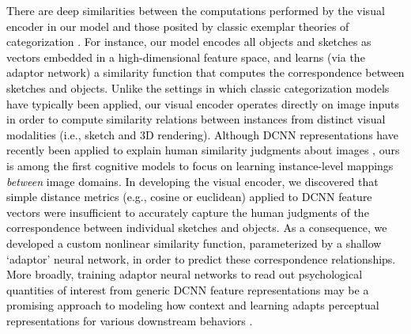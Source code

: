 \documentclass{svjour3}
\newcommand{\revised}[1]{\textcolor{Black}{#1}}
\begin{document}

\revised{There are deep similarities between the computations performed by the visual encoder in our model and those posited by classic exemplar theories of categorization \citep*{shepard1958stimulus,medin1978context,nosofsky1988exemplar}. For instance, our model encodes all objects and sketches as vectors embedded in a high-dimensional feature space, and learns (via the adaptor network) a similarity function that computes the correspondence between sketches and objects. Unlike the settings in which classic categorization models have typically been applied, our visual encoder operates directly on image inputs in order to compute similarity relations between instances from distinct visual modalities (i.e., sketch and 3D rendering). Although DCNN representations have recently been applied to explain human similarity judgments about images \citep*{peterson2018evaluating,kubilius2016deep}, ours is among the first cognitive models to focus on learning instance-level mappings \textit{between} image domains. In developing the visual encoder, we discovered that simple distance metrics (e.g., cosine or euclidean) applied to DCNN feature vectors were insufficient to accurately capture the human judgments of the correspondence between individual sketches and objects. As a consequence, we developed a custom nonlinear similarity function, parameterized by a shallow `adaptor' neural network, in order to predict these correspondence relationships. More broadly, training adaptor neural networks to read out psychological quantities of interest from generic DCNN feature representations may be a promising approach to modeling how context and learning  adapts perceptual representations for various downstream behaviors \citep*{nosofsky2011generalized,medin1978context}.}  
\end{document}

